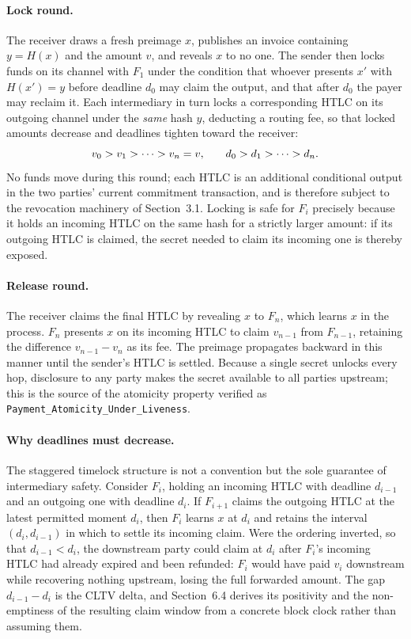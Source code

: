 \documentclass[sigconf,review]{acmart}
\theoremstyle{acmdefinition}
\begin{document}
\paragraph{Lock round.}
The receiver draws a fresh preimage $x$, publishes an invoice containing $y = H(x)$ and the amount $v$, and reveals $x$ to no one. The sender then locks funds on its channel with $F_1$ under the condition that whoever presents $x'$ with $H(x') = y$ before deadline $d_0$ may claim the output, and that after $d_0$ the payer may reclaim it. Each intermediary in turn locks a corresponding HTLC on its outgoing channel under the \emph{same} hash $y$, deducting a routing fee, so that locked amounts decrease and deadlines tighten toward the receiver:
\[
\small
v_0 > v_1 > \cdots > v_n = v,
\qquad
d_0 > d_1 > \cdots > d_n .
\]
No funds move during this round; each HTLC is an additional conditional output in the two parties' current commitment transaction, and is therefore subject to the revocation machinery of Section~3.1. Locking is safe for $F_i$ precisely because it holds an incoming HTLC on the same hash for a strictly larger amount: if its outgoing HTLC is claimed, the secret needed to claim its incoming one is thereby exposed.

\paragraph{Release round.}
The receiver claims the final HTLC by revealing $x$ to $F_n$, which learns $x$ in the process. $F_n$ presents $x$ on its incoming HTLC to claim $v_{n-1}$ from $F_{n-1}$, retaining the difference $v_{n-1} - v_n$ as its fee. The preimage propagates backward in this manner until the sender's HTLC is settled. Because a single secret unlocks every hop, disclosure to any party makes the secret available to all parties upstream; this is the source of the atomicity property verified as \texttt{Payment\_Atomicity\_Under\_Liveness}.

\paragraph{Why deadlines must decrease.}
The staggered timelock structure is not a convention but the sole guarantee of intermediary safety. Consider $F_i$, holding an incoming HTLC with deadline $d_{i-1}$ and an outgoing one with deadline $d_i$. If $F_{i+1}$ claims the outgoing HTLC at the latest permitted moment $d_i$, then $F_i$ learns $x$ at $d_i$ and retains the interval $(d_i, d_{i-1})$ in which to settle its incoming claim. Were the ordering inverted, so that $d_{i-1} < d_i$, the downstream party could claim at $d_i$ after $F_i$'s incoming HTLC had already expired and been refunded: $F_i$ would have paid $v_i$ downstream while recovering nothing upstream, losing the full forwarded amount. The gap $d_{i-1} - d_i$ is the CLTV delta, and Section~6.4 derives its positivity and the non-emptiness of the resulting claim window from a concrete block clock rather than assuming them.
\end{document}
